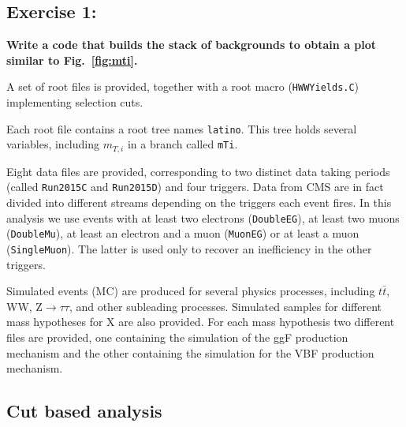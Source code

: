 \documentclass[a4paper,12pt]{article}
\begin{document}
\subsection*{Exercise 1: }
{\bf Write a code that builds the stack of backgrounds to obtain a plot
similar to Fig.~\ref{fig:mti}.}

A set of root files is provided, together with a root macro
(\verb;HWWYields.C;) implementing selection cuts.

Each root file contains a root tree names \verb;latino;. This tree holds
several variables, including $m_{T,i}$ in a branch called \verb;mTi;.

Eight data files are provided, corresponding to two distinct data taking periods
(called \verb;Run2015C; and \verb;Run2015D;) and four triggers. Data from CMS
are in fact divided into different streams depending on the triggers each
event fires. In this analysis we use events with at least two electrons
(\verb;DoubleEG;), at least two muons (\verb;DoubleMu;), at least an electron and a muon
(\verb;MuonEG;) or at least a muon  (\verb;SingleMuon;). The latter is used
only to recover an inefficiency in the other triggers.

Simulated events (MC) are produced for several physics processes, including
$t\bar{t}$, WW, Z$\rightarrow{}\tau\tau$, and other subleading processes.
Simulated samples for different mass hypotheses for X are also provided. For
each mass hypothesis two different files are provided, one containing the
simulation of the ggF production mechanism and the other containing the
simulation for the VBF production mechanism.

\subsection{Cut based analysis}
\end{document}
